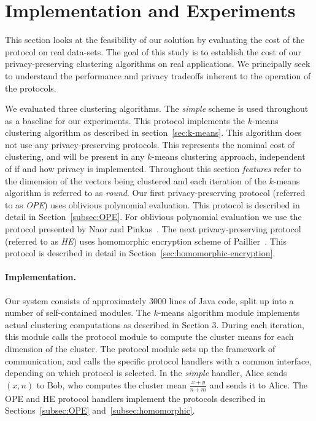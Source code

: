\section{Implementation and Experiments}
\label{sec:eval}

This section looks at the feasibility of our solution by evaluating
the cost of the protocol on real data-sets.  The goal of this study is
to establish the cost of our privacy-preserving clustering algorithms
on real applications. We principally seek to understand the
performance and privacy tradeoffs inherent to the operation of the
protocols.

We evaluated three clustering algorithms. The {\it simple} scheme is
used throughout as a baseline for our experiments.  This protocol
implements the $k$-means clustering algorithm as described in
section~\ref{sec:k-means}.  This algorithm does not use any
privacy-preserving protocols.  This represents the nominal cost of
clustering, and will be present in any $k$-means clustering approach,
independent of if and how privacy is implemented.  Throughout this
section {\it features} refer to the dimension of the vectors being
clustered and each iteration of the $k$-means algorithm is referred to
as {\it round}.  Our first privacy-preserving protocol (referred to as
{\it OPE}) uses oblivious polynomial evaluation. This protocol is
described in detail in Section~\ref{subsec:OPE}.  For oblivious
polynomial evaluation we use the protocol presented by Naor and
Pinkas~\cite{NaorPinkas99}. The next privacy-preserving protocol
(referred to as {\it HE}) uses homomorphic encryption scheme of
Paillier~\cite{Paillier99}. This protocol is described in detail in
Section~\ref{sec:homomorphic-encryption}.  

\paragraph{Implementation.}
Our system consists of approximately $3000$ lines of Java code, split
up into a number of self-contained modules.  The $k$-means algorithm
module implements actual clustering computations as described in
Section 3.  During each iteration, this module calls the {\small\sf
protocol} module to compute the cluster means for each dimension of
the cluster.  The {\small\sf protocol} module sets up the framework of
communication, and calls the specific protocol handlers with a common
interface, depending on which protocol is selected. In the {\it
simple} handler, Alice sends $(x,n)$ to Bob, who computes the cluster
mean $\frac{x+y}{n+m}$ and sends it to Alice.  The OPE and HE
protocol handlers implement the protocols described in
Sections~\ref{subsec:OPE} and~\ref{subsec:homomorphic}.

